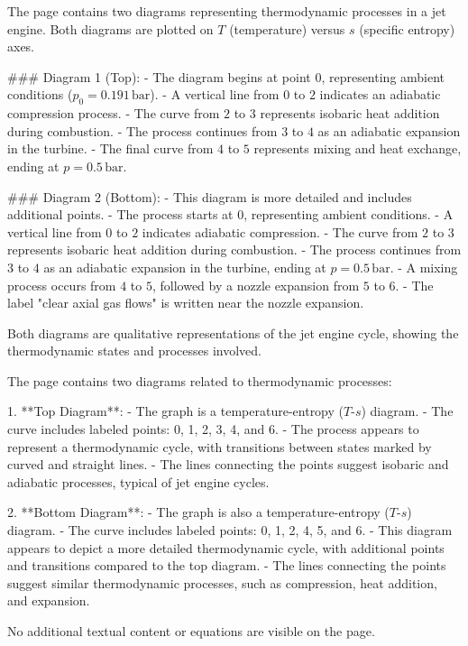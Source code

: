 The page contains two diagrams representing thermodynamic processes in a jet engine. Both diagrams are plotted on \( T \) (temperature) versus \( s \) (specific entropy) axes.  

### Diagram 1 (Top):  
- The diagram begins at point \( 0 \), representing ambient conditions (\( p_0 = 0.191 \, \text{bar} \)).  
- A vertical line from \( 0 \) to \( 2 \) indicates an adiabatic compression process.  
- The curve from \( 2 \) to \( 3 \) represents isobaric heat addition during combustion.  
- The process continues from \( 3 \) to \( 4 \) as an adiabatic expansion in the turbine.  
- The final curve from \( 4 \) to \( 5 \) represents mixing and heat exchange, ending at \( p = 0.5 \, \text{bar} \).  

### Diagram 2 (Bottom):  
- This diagram is more detailed and includes additional points.  
- The process starts at \( 0 \), representing ambient conditions.  
- A vertical line from \( 0 \) to \( 2 \) indicates adiabatic compression.  
- The curve from \( 2 \) to \( 3 \) represents isobaric heat addition during combustion.  
- The process continues from \( 3 \) to \( 4 \) as an adiabatic expansion in the turbine, ending at \( p = 0.5 \, \text{bar} \).  
- A mixing process occurs from \( 4 \) to \( 5 \), followed by a nozzle expansion from \( 5 \) to \( 6 \).  
- The label "clear axial gas flows" is written near the nozzle expansion.  

Both diagrams are qualitative representations of the jet engine cycle, showing the thermodynamic states and processes involved.

The page contains two diagrams related to thermodynamic processes:

1. **Top Diagram**:
   - The graph is a temperature-entropy (\( T \)-\( s \)) diagram.
   - The curve includes labeled points: 0, 1, 2, 3, 4, and 6.
   - The process appears to represent a thermodynamic cycle, with transitions between states marked by curved and straight lines.
   - The lines connecting the points suggest isobaric and adiabatic processes, typical of jet engine cycles.

2. **Bottom Diagram**:
   - The graph is also a temperature-entropy (\( T \)-\( s \)) diagram.
   - The curve includes labeled points: 0, 1, 2, 4, 5, and 6.
   - This diagram appears to depict a more detailed thermodynamic cycle, with additional points and transitions compared to the top diagram.
   - The lines connecting the points suggest similar thermodynamic processes, such as compression, heat addition, and expansion.

No additional textual content or equations are visible on the page.